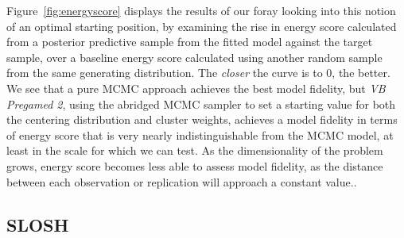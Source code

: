 Figure~\ref{fig:energyscore} displays the results of our foray looking into this 
    notion of an optimal starting position, by examining the rise in energy score 
    calculated from a posterior predictive sample from the fitted model against the target 
    sample, over a baseline energy score calculated using another random sample from the same 
    generating distribution.  The \emph{closer} the curve is to 0, the better.  We see that 
    a pure MCMC approach achieves the best model fidelity, but \emph{VB Pregamed 2}, using 
    the abridged MCMC sampler to set a starting value for both the centering distribution 
    and cluster weights, achieves a model fidelity in terms of energy score that is very
    nearly indistinguishable from the MCMC model, at least in the scale for which we can test.
    As the dimensionality of the problem grows, energy score becomes less able to assess model
    fidelity, as the distance between each observation or replication will approach a constant
    value..

\subsection{SLOSH}

